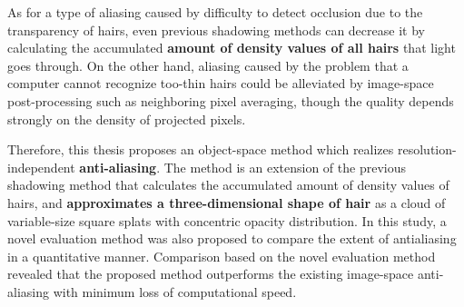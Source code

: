 %
As for a type of aliasing caused by difficulty to detect occlusion due to the transparency of hairs, even previous shadowing methods can decrease it by calculating the accumulated \textbf{amount of density values of all hairs} that light goes through.
%
On the other hand, aliasing caused by the problem that a computer cannot recognize too-thin hairs could be alleviated by image-space post-processing such as neighboring pixel averaging, though the quality depends strongly on the density of projected pixels.\par
%
Therefore, this thesis proposes an object-space method which realizes resolution-independent \textbf{anti-aliasing}. The method is an extension of the previous shadowing method that calculates the accumulated amount of density values of hairs, and \textbf{approximates a three-dimensional shape of hair} as a cloud of variable-size square splats with concentric opacity distribution.
%
In this study, a novel evaluation method was also proposed to compare the extent of antialiasing in a quantitative manner.
%
Comparison based on the novel evaluation method revealed that the proposed method outperforms the existing image-space anti-aliasing with minimum loss of computational speed.
%
